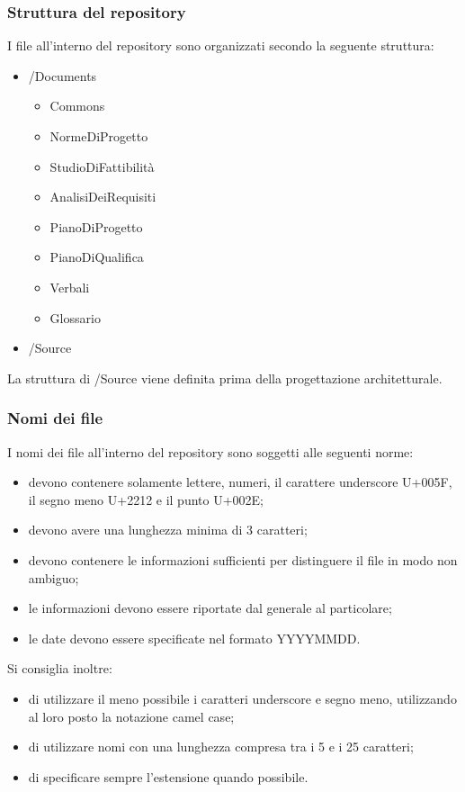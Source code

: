 		\subsubsection{Struttura del repository}
				I file all’interno del repository sono organizzati secondo la seguente struttura:
				\begin{itemize}
					\item /Documents
					\begin{itemize}
						\item Commons
						\item NormeDiProgetto
						\item StudioDiFattibilità
						\item AnalisiDeiRequisiti
						\item PianoDiProgetto
						\item PianoDiQualifica
						\item Verbali
						\item Glossario
					\end{itemize}
					\item /Source
				\end{itemize}
				La struttura di /Source viene definita prima della progettazione architetturale.

		\subsubsection{Nomi dei file}
				I nomi dei file all’interno del repository sono soggetti alle seguenti norme:
				\begin{itemize}
					\item devono contenere solamente lettere, numeri, il carattere underscore U+005F, il segno meno U+2212 e il punto U+002E;
					\item devono avere una lunghezza minima di 3 caratteri;
					\item devono contenere le informazioni sufficienti per distinguere il file in modo non ambiguo;
					\item le informazioni devono essere riportate dal generale al particolare;
					\item le date devono essere specificate nel formato YYYYMMDD.
				\end{itemize}
				Si consiglia inoltre:
				\begin{itemize}
					\item di utilizzare il meno possibile i caratteri underscore e segno meno, utilizzando al loro posto la notazione camel case;
					\item di utilizzare nomi con una lunghezza compresa tra i 5 e i 25 caratteri;
					\item di specificare sempre l’estensione quando possibile.
				\end{itemize}

